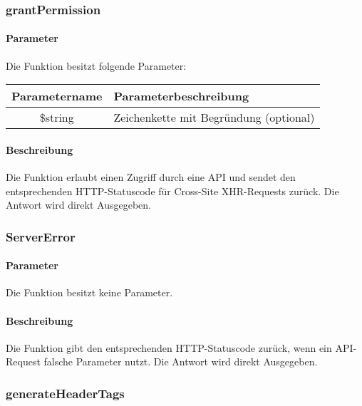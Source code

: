 \subsubsection{grantPermission}
\paragraph{Parameter} Die Funktion besitzt folgende Parameter:
\begin{table}[H]
	\begin{tabular}{|c|p{11cm}|}
		\hline
		\textbf{Parametername} & \textbf{Parameterbeschreibung} \\ \hline
		\$string & Zeichenkette mit Begründung (optional) \\ \hline
	\end{tabular}
\end{table}
\paragraph{Beschreibung} Die Funktion erlaubt einen Zugriff durch eine API und sendet den entsprechenden HTTP-Statuscode für Cross-Site XHR-Requests zurück. Die Antwort wird direkt Ausgegeben.
\subsubsection{ServerError}
\paragraph{Parameter} Die Funktion besitzt keine Parameter.
\paragraph{Beschreibung} Die Funktion gibt den entsprechenden HTTP-Statuscode zurück, wenn ein API-Request falsche Parameter nutzt. Die Antwort wird direkt Ausgegeben.
\subsubsection{generateHeaderTags}
